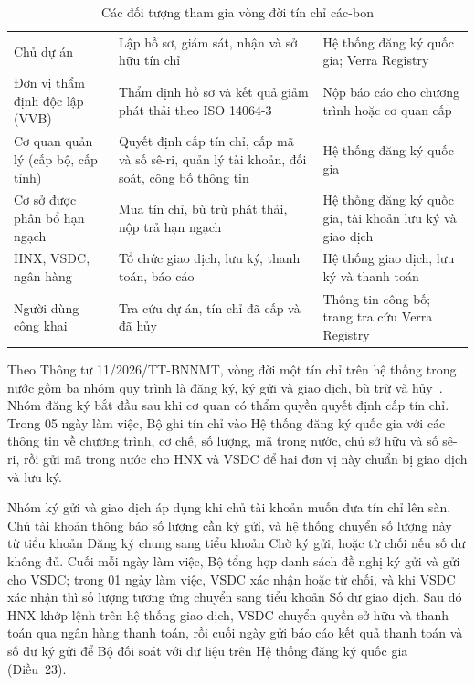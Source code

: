 \HinhMoHinhToChuc

\begin{table}[!htbp]
    \centering
    \caption{Các đối tượng tham gia vòng đời tín chỉ các-bon}
    \label{tab:ks-tacnhan}
    \label{tab:ks-doituong}
    \small
    \begin{tabularx}{\textwidth}{|L{3.3cm}|Y|L{3.8cm}|}
        \hline
         &  &  \\
        \hline
        Chủ dự án & Lập hồ sơ, giám sát, nhận và sở hữu tín chỉ & Hệ thống đăng ký quốc gia; Verra Registry \\
        \hline
        Đơn vị thẩm định độc lập (VVB) & Thẩm định hồ sơ và kết quả giảm phát thải theo ISO 14064-3 & Nộp báo cáo cho chương trình hoặc cơ quan cấp \\
        \hline
        Cơ quan quản lý (cấp bộ, cấp tỉnh) & Quyết định cấp tín chỉ, cấp mã và số sê-ri, quản lý tài khoản, đối soát, công bố thông tin & Hệ thống đăng ký quốc gia \\
        \hline
        Cơ sở được phân bổ hạn ngạch & Mua tín chỉ, bù trừ phát thải, nộp trả hạn ngạch & Hệ thống đăng ký quốc gia, tài khoản lưu ký và giao dịch \\
        \hline
        HNX, VSDC, ngân hàng & Tổ chức giao dịch, lưu ký, thanh toán, báo cáo & Hệ thống giao dịch, lưu ký và thanh toán \\
        \hline
        Người dùng công khai & Tra cứu dự án, tín chỉ đã cấp và đã hủy & Thông tin công bố; trang tra cứu Verra Registry \\
        \hline
    \end{tabularx}
\end{table}

Theo Thông tư 11/2026/TT-BNNMT, vòng đời một tín chỉ trên hệ thống trong nước gồm ba nhóm quy trình là đăng ký, ký gửi và giao dịch, bù trừ và hủy~\cite{vietnam2026thongtu11,vietnam2026nghidinh29}. Nhóm đăng ký bắt đầu sau khi cơ quan có thẩm quyền quyết định cấp tín chỉ. Trong 05 ngày làm việc, Bộ ghi tín chỉ vào Hệ thống đăng ký quốc gia với các thông tin về chương trình, cơ chế, số lượng, mã trong nước, chủ sở hữu và số sê-ri, rồi gửi mã trong nước cho HNX và VSDC để hai đơn vị này chuẩn bị giao dịch và lưu ký.

Nhóm ký gửi và giao dịch áp dụng khi chủ tài khoản muốn đưa tín chỉ lên sàn. Chủ tài khoản thông báo số lượng cần ký gửi, và hệ thống chuyển số lượng này từ tiểu khoản Đăng ký chung sang tiểu khoản Chờ ký gửi, hoặc từ chối nếu số dư không đủ. Cuối mỗi ngày làm việc, Bộ tổng hợp danh sách đề nghị ký gửi và gửi cho VSDC; trong 01 ngày làm việc, VSDC xác nhận hoặc từ chối, và khi VSDC xác nhận thì số lượng tương ứng chuyển sang tiểu khoản Số dư giao dịch. Sau đó HNX khớp lệnh trên hệ thống giao dịch, VSDC chuyển quyền sở hữu và thanh toán qua ngân hàng thanh toán, rồi cuối ngày gửi báo cáo kết quả thanh toán và số dư ký gửi để Bộ đối soát với dữ liệu trên Hệ thống đăng ký quốc gia (Điều~23).

